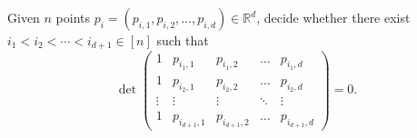 \begin{problem}[%
	name={GPT in \(\mathbb{R}^d\)},
	label=problem:gpt-d%
]
	Given \(n\) points \(p_i = (p_{i,1},p_{i,2}, \ldots, p_{i,d}) \in \mathbb{R}^d\), decide
	whether there exist \(i_1 < i_2 < \cdots < i_{d+1} \in [n]\) such that
	\begin{displaymath}
		\det
		\left(
		\begin{matrix}
			1 & p_{i_1,1} & p_{i_1,2} & \hdots & p_{i_1,d} \\
			1 & p_{i_2,1} & p_{i_2,2} & \hdots & p_{i_2,d} \\
			\vdots & \vdots & \vdots & \ddots & \vdots \\
			1 & p_{i_{d+1},1} & p_{i_{d+1},2} & \hdots & p_{i_{d+1},d}
		\end{matrix}
		\right)
		= 0.
	\end{displaymath}
\end{problem}
